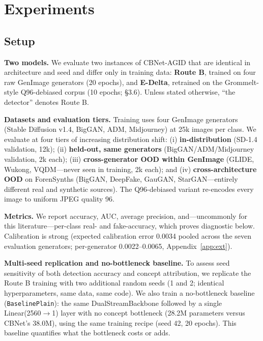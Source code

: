 \section{Experiments}

\subsection{Setup}

\textbf{Two models.} We evaluate two instances of CBNet-AGID that are identical in architecture and seed and differ only in training data: \textbf{Route B}, trained on four raw GenImage generators (20 epochs), and \textbf{E-Delta}, retrained on the Grommelt-style Q96-debiased corpus (10 epochs; \S{}3.6). Unless stated otherwise, ``the detector'' denotes Route B.

\textbf{Datasets and evaluation tiers.} Training uses four GenImage \citep{zhu2023genimage} generators (Stable Diffusion v1.4, BigGAN, ADM, Midjourney) at 25k images per class. We evaluate at four tiers of increasing distribution shift: (i) \textbf{in-distribution} (SD-1.4 validation, 12k); (ii) \textbf{held-out, same generators} (BigGAN/ADM/Midjourney validation, 2k each); (iii) \textbf{cross-generator OOD within GenImage} (GLIDE, Wukong, VQDM---never seen in training, 2k each); and (iv) \textbf{cross-architecture OOD} on ForenSynths \citep{wang2020cnngenerated} (BigGAN, DeepFake, GauGAN, StarGAN---entirely different real and synthetic sources). The Q96-debiased variant re-encodes every image to uniform JPEG quality 96.

\textbf{Metrics.} We report accuracy, AUC, average precision, and---uncommonly for this literature---per-class real- and fake-accuracy, which proves diagnostic below. Calibration is strong (expected calibration error 0.0034 pooled across the seven evaluation generators; per-generator 0.0022--0.0065, Appendix~\ref{app:ext}).

\textbf{Multi-seed replication and no-bottleneck baseline.} To assess seed sensitivity of both detection accuracy and concept attribution, we replicate the Route B training with two additional random seeds (1 and 2; identical hyperparameters, same data, same code). We also train a no-bottleneck baseline (\texttt{BaselinePlain}): the same DualStreamBackbone followed by a single Linear(2560$\to$1) layer with no concept bottleneck (28.2M parameters versus CBNet's 38.0M), using the same training recipe (seed 42, 20 epochs). This baseline quantifies what the bottleneck costs or adds.

